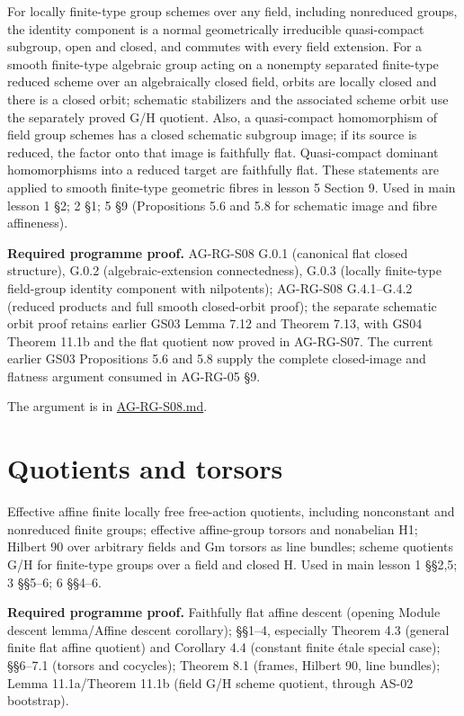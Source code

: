 \documentclass[11pt,a4paper,openany]{report}
\newcounter{none}
\begin{document}
For locally finite-type group schemes over any field, including nonreduced groups, the identity component is a normal geometrically irreducible quasi-compact subgroup, open and closed, and commutes with every field extension. For a smooth finite-type algebraic group acting on a nonempty separated finite-type reduced scheme over an algebraically closed field, orbits are locally closed and there is a closed orbit; schematic stabilizers and the associated scheme orbit use the separately proved G/H quotient. Also, a quasi-compact homomorphism of field group schemes has a closed schematic subgroup image; if its source is reduced, the factor onto that image is faithfully flat. Quasi-compact dominant homomorphisms into a reduced target are faithfully flat. These statements are applied to smooth finite-type geometric fibres in lesson 5 Section 9. Used in main lesson 1 §2; 2 §1; 5 §9 (Propositions 5.6 and 5.8 for schematic image and fibre affineness).

\textbf{Required programme proof.} AG-RG-S08 G.0.1 (canonical flat closed structure), G.0.2 (algebraic-extension connectedness), G.0.3 (locally finite-type field-group identity component with nilpotents); AG-RG-S08 G.4.1--G.4.2 (reduced products and full smooth closed-orbit proof); the separate schematic orbit proof retains earlier GS03 Lemma 7.12 and Theorem 7.13, with GS04 Theorem 11.1b and the flat quotient now proved in AG-RG-S07. The current earlier GS03 Propositions 5.6 and 5.8 supply the complete closed-image and flatness argument consumed in AG-RG-05 §9.

The argument is in \href{https://github.com/KokunoYumeto/open-math-courses/blob/main/docs/courses/AG-RG/AG-RG-S08.md}{AG-RG-S08.md}.

\section{Quotients and torsors}\label{quotients-and-torsors}

Effective affine finite locally free free-action quotients, including nonconstant and nonreduced finite groups; effective affine-group torsors and nonabelian H1; Hilbert 90 over arbitrary fields and Gm torsors as line bundles; scheme quotients G/H for finite-type groups over a field and closed H. Used in main lesson 1 §§2,5; 3 §§5--6; 6 §§4--6.

\textbf{Required programme proof.} Faithfully flat affine descent (opening Module descent lemma/Affine descent corollary); §§1--4, especially Theorem 4.3 (general finite flat affine quotient) and Corollary 4.4 (constant finite étale special case); §§6--7.1 (torsors and cocycles); Theorem 8.1 (frames, Hilbert 90, line bundles); Lemma 11.1a/Theorem 11.1b (field G/H scheme quotient, through AS-02 bootstrap).
\end{document}
